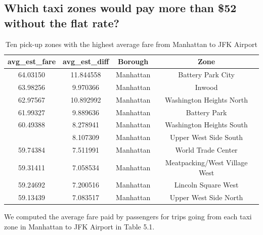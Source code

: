 \documentclass[12pt,twoside]{reedthesis}
\theoremstyle{definition}
\theoremstyle{definition}
\theoremstyle{definition}
\theoremstyle{remark}
\begin{document}
\subsection{Which taxi zones would pay more than \$52 without the flat
rate?}\label{which-taxi-zones-would-pay-more-than-52-without-the-flat-rate}
\begin{table}

\caption{\label{tab:unnamed-chunk-95}Ten pick-up zones with the highest average  fare from Manhattan to JFK Airport}
\centering
\begin{tabular}[t]{cccc}
\toprule
avg\_est\_fare & avg\_est\_diff & Borough & Zone\\
\midrule
64.03150 & 11.844558 & Manhattan & Battery Park City\\
63.98256 & 9.970366 & Manhattan & Inwood\\
62.97567 & 10.892992 & Manhattan & Washington Heights North\\
61.99327 & 9.889636 & Manhattan & Battery Park\\
60.49388 & 8.278941 & Manhattan & Washington Heights South\\
\addlinespace
60.18006 & 8.107309 & Manhattan & Upper West Side South\\
59.74384 & 7.511991 & Manhattan & World Trade Center\\
59.31411 & 7.058534 & Manhattan & Meatpacking/West Village West\\
59.24692 & 7.200516 & Manhattan & Lincoln Square West\\
59.13439 & 7.083517 & Manhattan & Upper West Side North\\
\bottomrule
\end{tabular}
\end{table}
We computed the average fare paid by passengers for trips going from
each taxi zone in Manhattan to JFK Airport in Table 5.1.
\end{document}
